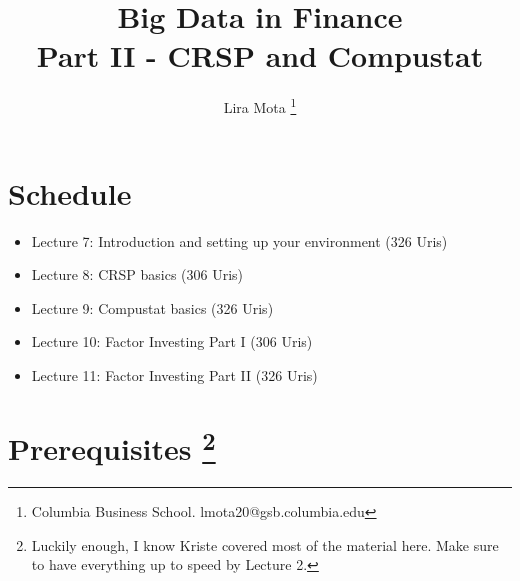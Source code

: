 \documentclass[12pts]{article}
\title{Big Data in Finance\\ \vspace{0.5cm} Part II - CRSP and Compustat}
\author{Lira Mota \thanks{Columbia Business School. lmota20@gsb.columbia.edu}}
\begin{document}
\maketitle

\section*{Schedule}

\begin{itemize}
	\item Lecture 7: Introduction and setting up your environment (326 Uris)
	\item Lecture 8: CRSP basics (306 Uris)
	\item Lecture 9: Compustat basics (326 Uris)
	\item Lecture 10: Factor Investing Part I (306 Uris)
	\item Lecture 11: Factor Investing Part II (326 Uris)
\end{itemize}

\section*{Prerequisites \footnote{Luckily enough, I know Kriste covered most of the material here. Make sure to have everything up to speed by Lecture 2.}}
\end{document}
